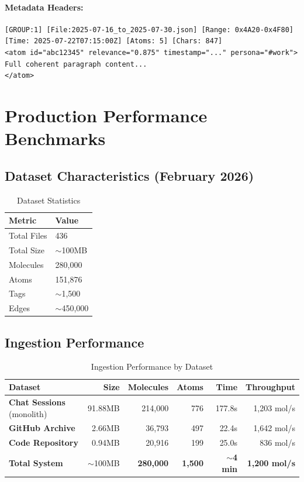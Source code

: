 \documentclass[11pt]{article}
\begin{document}
\paragraph{Metadata Headers:}
\begin{verbatim}
[GROUP:1] [File:2025-07-16_to_2025-07-30.json] [Range: 0x4A20-0x4F80] 
[Time: 2025-07-22T07:15:00Z] [Atoms: 5] [Chars: 847]
<atom id="abc12345" relevance="0.875" timestamp="..." persona="#work">
Full coherent paragraph content...
</atom>
\end{verbatim}

\section{Production Performance Benchmarks}
\label{sec:benchmarks}

\subsection{Dataset Characteristics (February 2026)}

\begin{table}[h]
\centering
\caption{Dataset Statistics}
\label{tab:dataset}
\begin{tabular}{@{}ll@{}}
\toprule
\textbf{Metric} & \textbf{Value} \\ \midrule
Total Files & 436 \\
Total Size & $\sim$100MB \\
Molecules & 280,000 \\
Atoms & 151,876 \\
Tags & $\sim$1,500 \\
Edges & $\sim$450,000 \\ \bottomrule
\end{tabular}
\end{table}

\subsection{Ingestion Performance}

\begin{table}[h]
\centering
\caption{Ingestion Performance by Dataset}
\label{tab:ingestion}
\begin{tabular}{@{}lrrrrr@{}}
\toprule
\textbf{Dataset} & \textbf{Size} & \textbf{Molecules} & \textbf{Atoms} & \textbf{Time} & \textbf{Throughput} \\ \midrule
\textbf{Chat Sessions} (monolith) & 91.88MB & 214,000 & 776 & 177.8s & 1,203 mol/s \\
\textbf{GitHub Archive} & 2.66MB & 36,793 & 497 & 22.4s & 1,642 mol/s \\
\textbf{Code Repository} & 0.94MB & 20,916 & 199 & 25.0s & 836 mol/s \\
\textbf{Total System} & $\sim$100MB & \textbf{280,000} & \textbf{1,500} & \textbf{$\sim$4 min} & \textbf{1,200 mol/s} \\ \bottomrule
\end{tabular}
\end{table}
\end{document}
